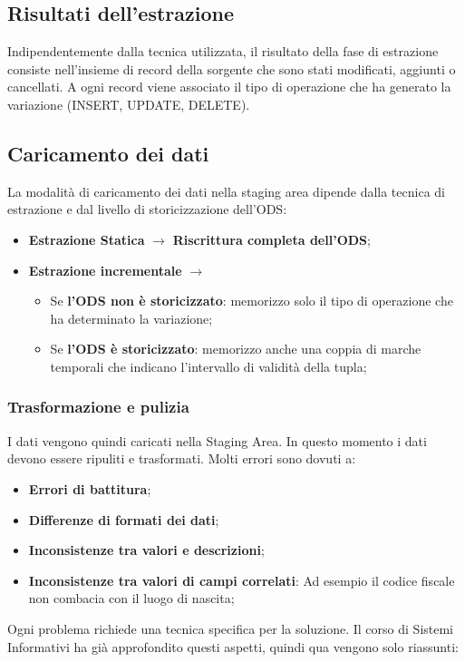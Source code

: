 \subsection{Risultati dell'estrazione}
Indipendentemente dalla tecnica utilizzata, il risultato della fase di estrazione consiste nell'insieme di record della sorgente che sono stati modificati, aggiunti o cancellati. A ogni record viene associato il tipo di operazione che ha generato la variazione (INSERT, UPDATE, DELETE).

\subsection{Caricamento dei dati}
La modalità di caricamento dei dati nella staging area dipende dalla tecnica di estrazione e dal livello di storicizzazione dell'ODS:
\begin{itemize}
	\item \textbf{Estrazione Statica} $\xrightarrow{}$ \textbf{Riscrittura completa dell'ODS};
	\item \textbf{Estrazione incrementale} $\xrightarrow{}$
	\begin{itemize}
		\item Se \textbf{l'ODS non è storicizzato}: memorizzo solo il tipo di operazione che ha determinato la variazione;
		\item Se \textbf{l'ODS è storicizzato}: memorizzo anche una coppia di marche temporali che indicano l'intervallo di validità della tupla;
	\end{itemize}
\end{itemize}

\subsubsection{Trasformazione e pulizia}
I dati vengono quindi caricati nella Staging Area. In questo momento i dati devono essere ripuliti e trasformati. Molti errori sono dovuti a:
\begin{itemize}
	\item \textbf{Errori di battitura};
	\item \textbf{Differenze di formati dei dati};
	\item \textbf{Inconsistenze tra valori e descrizioni};
	\item \textbf{Inconsistenze tra valori di campi correlati}: Ad esempio il codice fiscale non combacia con il luogo di nascita;
\end{itemize}
\noindent Ogni problema richiede una tecnica specifica per la soluzione. Il corso di Sistemi Informativi ha già approfondito questi aspetti, quindi qua vengono solo riassunti:

